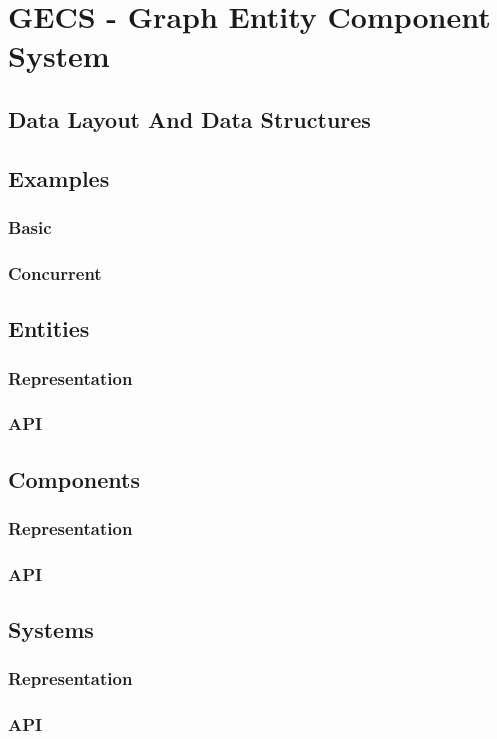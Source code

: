 \section{GECS - Graph Entity Component System}

\subsection{Data Layout And Data Structures}

\subsection{Examples}
\subsubsection{Basic}
\subsubsection{Concurrent}

\subsection{Entities}
\subsubsection{Representation}
\subsubsection{API}

\subsection{Components}
\subsubsection{Representation}
\subsubsection{API}

\subsection{Systems}
\subsubsection{Representation}
\subsubsection{API}

